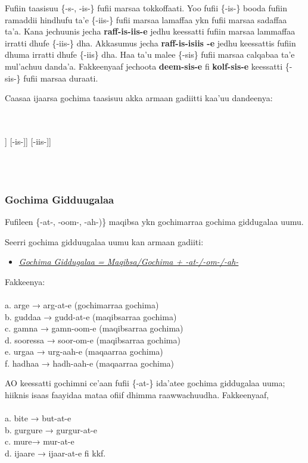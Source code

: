 \documentclass[11pt,b5paper]{book}
\begin{document}
Fufiin taasisuu \{-s-, -is-\} fufii marsaa tokkoffaati. Yoo fufii \{-is-\} booda fufiin ramaddii hindhufu ta’e \{-iis-\} fufii marsaa lamaffaa ykn fufii marsaa sadaffaa ta’a. Kana jechuunis jecha \textbf{raff-is-iis-e} jedhu keessatti fufiin marsaa lammaffaa irratti dhufe \{-iis-\} dha. Akkasumus jecha \textbf{raff-is-isiis -e} jedhu keessattis fufiin dhuma irratti dhufe \{-iis\} dha. Haa ta’u malee \{-sis\} fufii marsaa calqabaa ta’e mul’achuu danda’a. Fakkeenyaaf jechoota \textbf{deem-sis-e }fi \textbf{kolf-sis-e} keessatti \{-sis-\} fufii marsaa duraati. 

Caasaa ijaarsa gochima taasisuu akka armaan gadiitti kaa'uu dandeenya:\\
\\
\\
\begin{forest}
	[rafisisiis- [rafisis- [rafis [raf-] [-is-]] [-is-]] [-iis-]]
\end{forest}
\\
\\

\subsubsection{Gochima Gidduugalaa}

Fufileen \{-at-, -oom-, -ah-)\} maqibsa ykn gochimarraa gochima giddugalaa uumu. 

Seerri gochima gidduugalaa uumu kan armaan gadiiti:
\begin{itemize}
	\item \textit{\underline{Gochima Giddugalaa = Maqibsa/Gochima + -at-/-om-/-ah-}}
\end{itemize}
Fakkeenya:\\
\\
a. arge → arg-at-e (gochimarraa gochima)\\
b. guddaa → gudd-at-e (maqibsarraa gochima)\\
c. gamna → gamn-oom-e (maqibsarraa gochima)\\
d. sooressa → soor-om-e (maqibsarraa gochima)\\
e. urgaa → urg-aah-e (maqaarraa gochima)\\
f. hadhaa → hadh-aah-e (maqaarraa gochima)

AO keessatti gochimni ce’aan fufii \{-at-\} ida’atee gochima giddugalaa uuma; hiiknis isaas faayidaa mataa ofiif dhimma raawwachuudha. Fakkeenyaaf, \\
\\
a. bite → but-at-e\\
b. gurgure → gurgur-at-e\\
c. mure→ mur-at-e\\
d. ijaare → ijaar-at-e fi kkf.
\end{document}
